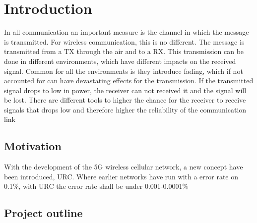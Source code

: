 \chapter{Introduction}

%

In all communication an important measure is the channel in which the message is transmitted. For wireless communication, this is no different. The message is transmitted from a \gls{TX} through the air and to a \gls{RX}. This transmission can be done in different environments, which have different impacts on the received signal. Common for all the environments is they introduce fading, which if not accounted for can have devastating effects for the transmission. If the transmitted signal drops to low in power, the receiver can not received it and the signal will be lost. There are different tools to higher the chance for the receiver to receive signals that drops low and therefore higher the reliability of the communication link



\section{Motivation}
With the development of the 5G wireless cellular network, a new concept have been introduced, \gls{URC}. Where earlier networks have run with a error rate on 0.1\%, with URC the error rate shall be under 0.001-0.0001\%





\section{Project outline}





